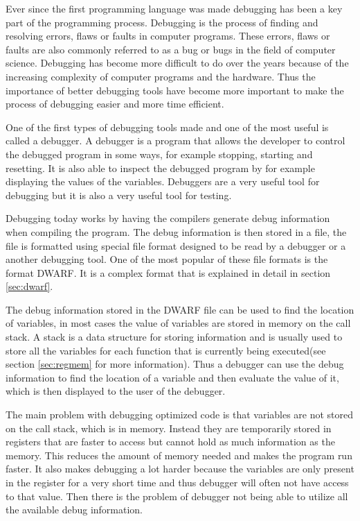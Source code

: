 
Ever since the first programming language was made debugging has been a key part of the programming process.
Debugging is the process of finding and resolving errors, flaws or faults in computer programs.
These errors, flaws or faults are also commonly referred to as a bug or bugs in the field of computer science.
Debugging has become more difficult to do over the years because of the increasing complexity of computer programs and the hardware.
Thus the importance of better debugging tools have become more important to make the process of debugging easier and more time efficient.


One of the first types of debugging tools made and one of the most useful is called a debugger.
A debugger is a program that allows the developer to control the debugged program in some ways, for example stopping, starting and resetting.
It is also able to inspect the debugged program by for example displaying the values of the variables.
Debuggers are a very useful tool for debugging but it is also a very useful tool for testing.


Debugging today works by having the compilers generate debug information when compiling the program.
The debug information is then stored in a file, the file is formatted using special file format designed to be read by a debugger or a another debugging tool.
One of the most popular of these file formats is the format \gls{DWARF}.
It is a complex format that is explained in detail in section \ref{sec:dwarf}.


The debug information stored in the \gls{DWARF} file can be used to find the location of variables, in most cases the value of variables are stored in memory on the call stack.
A stack is a data structure for storing information and is usually used to store all the variables for each function that is currently being executed(see section \ref{sec:regmem} for more information).
Thus a debugger can use the debug information to find the location of a variable and then evaluate the value of it, which is then displayed to the user of the debugger.


The main problem with debugging optimized code is that variables are not stored on the call stack, which is in memory.
Instead they are temporarily stored in registers that are faster to access but cannot hold as much information as the memory.
This reduces the amount of memory needed and makes the program run faster.
It also makes debugging a lot harder because the variables are only present in the register for a very short time and thus debugger will often not have access to that value.
Then there is the problem of debugger not being able to utilize all the available debug information.


